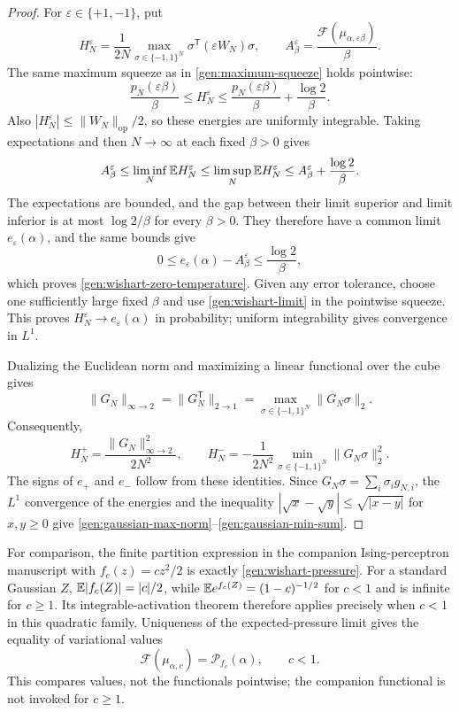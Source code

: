 \begin{proof}
For $\varepsilon\in\{+1,-1\}$, put
\[
 H_N^\varepsilon=\frac1{2N}
 \max_{\sigma\in\{-1,1\}^N}\sigma^{\mathsf T}(\varepsilon W_N)\sigma,
 \qquad
 A_\beta^\varepsilon=
 \frac{\mathcal F(\mu_{\alpha,\varepsilon\beta})}{\beta}.
\]
The same maximum squeeze as in \eqref{gen:maximum-squeeze} holds
pointwise:
\[
 \frac{p_N(\varepsilon\beta)}{\beta}
 \le H_N^\varepsilon\le
 \frac{p_N(\varepsilon\beta)}{\beta}+\frac{\log2}{\beta}.
\]
Also $|H_N^\varepsilon|\le\|W_N\|_{\mathrm{op}}/2$, so these energies
are uniformly integrable. Taking expectations and then $N\to\infty$
at each fixed $\beta>0$ gives
\[
 A_\beta^\varepsilon
 \le\liminf_N\mathbb E H_N^\varepsilon
 \le\limsup_N\mathbb E H_N^\varepsilon
 \le A_\beta^\varepsilon+\frac{\log2}{\beta}.
\]
The expectations are bounded, and the gap between their limit superior
and limit inferior is at most $\log2/\beta$ for every $\beta>0$.
They therefore have a common limit $e_\varepsilon(\alpha)$, and the
same bounds give
\[
 0\le e_\varepsilon(\alpha)-A_\beta^\varepsilon
 \le\frac{\log2}{\beta},
\]
which proves \eqref{gen:wishart-zero-temperature}. Given any error
tolerance, choose one sufficiently large fixed $\beta$ and use
\eqref{gen:wishart-limit} in the pointwise squeeze. This proves
$H_N^\varepsilon\to e_\varepsilon(\alpha)$ in probability; uniform
integrability gives convergence in $L^1$.

Dualizing the Euclidean norm and maximizing a linear functional over
the cube gives
\[
 \|G_N\|_{\infty\to2}
 =\|G_N^{\mathsf T}\|_{2\to1}
 =\max_{\sigma\in\{-1,1\}^N}\|G_N\sigma\|_2.
\]
Consequently,
\[
 H_N^+=\frac{\|G_N\|_{\infty\to2}^2}{2N^2},
 \qquad
 H_N^-=-\frac1{2N^2}\min_{\sigma\in\{-1,1\}^N}\|G_N\sigma\|_2^2.
\]
The signs of $e_+$ and $e_-$ follow from these identities. Since
$G_N\sigma=\sum_i\sigma_i g_{N,i}$, the $L^1$ convergence of the
energies and the inequality
$|\sqrt{x}-\sqrt{y}|\le\sqrt{|x-y|}$ for $x,y\ge0$ give
\eqref{gen:gaussian-max-norm}--\eqref{gen:gaussian-min-sum}.
\end{proof}

For comparison, the finite partition expression in the companion
Ising-perceptron manuscript with $f_c(z)=cz^2/2$ is exactly
\eqref{gen:wishart-pressure}. For a standard Gaussian $Z$,
$\mathbb E|f_c(Z)|=|c|/2$, while
$\mathbb E e^{f_c(Z)}=(1-c)^{-1/2}$ for $c<1$ and is infinite for $c\ge1$.
Its integrable-activation theorem
\cite[Theorem~8.3]{OpenAIIsingPerceptron2026} therefore applies precisely
when $c<1$ in this quadratic family. Uniqueness of the expected-pressure
limit gives the equality of variational values
\[
 \mathcal F(\mu_{\alpha,c})=\mathcal P_{f_c}(\alpha),
 \qquad c<1.
\]
This compares values, not the functionals pointwise; the companion
functional is not invoked for $c\ge1$.

